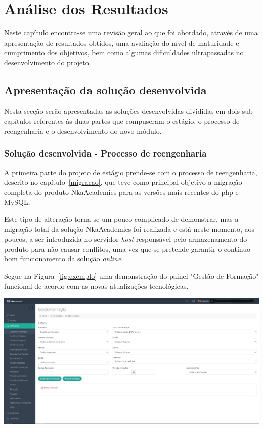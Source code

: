 
\chapter{Análise dos Resultados}
\label{analise}
Neste capítulo encontra-se uma revisão geral ao que foi abordado, através de uma apresentação de resultados obtidos, uma avaliação do nível de maturidade e cumprimento dos objetivos, bem como algumas dificuldades ultrapassadas no desenvolvimento do projeto.

\section{Apresentação da solução desenvolvida}
\label{app}
Nesta secção serão apresentadas as soluções desenvolvidas divididas em dois sub-capítulos referentes às duas partes que compuseram o estágio, o processo de reengenharia e o desenvolvimento do novo módulo.

\subsection{Solução desenvolvida - Processo de reengenharia}

A primeira parte do projeto de estágio prende-se com o processo de reengenharia, descrito no capítulo~\ref{migracao}, que teve como principal objetivo a migração completa do produto NkaAcademies para as versões mais recentes do \acrshort{php} e MySQL.

Este tipo de alteração torna-se um pouco complicado de demonstrar, mas a migração total da solução NkaAcademies foi realizada e está neste momento, aos poucos, a ser introduzida no servidor \textit{host} responsável pelo armazenamento do produto para não causar conflitos, uma vez que se pretende garantir o contínuo bom funcionamento da solução \textit{online}.

Segue na Figura~\ref{fig:exemplo} uma demonstração do painel "Gestão de Formação"  funcional de acordo com as novas atualizações tecnológicas.

\begin{center}
        \includegraphics[width=\textwidth,height=\textheight,keepaspectratio]{images/Exemplo.png}
        \label{fig:exemplo}
\end{center}

